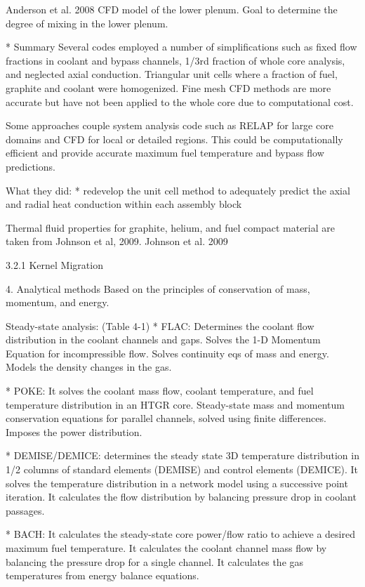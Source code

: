 Anderson et al. 2008 %
CFD model of the lower plenum.
Goal to determine the degree of mixing in the lower plenum.

* Summary
Several codes employed a number of simplifications such as fixed flow fractions in coolant and bypass channels, 1/3rd fraction of whole core analysis, and neglected axial conduction.
Triangular unit cells where a fraction of fuel, graphite and coolant were homogenized.
Fine mesh CFD methods are more accurate but have not been applied to the whole core due to computational cost.

Some approaches couple system analysis code such as RELAP for large core domains and CFD for local or detailed regions.
This could be computationally efficient and provide accurate maximum fuel temperature and bypass flow predictions.

What they did:
* redevelop the unit cell method to adequately predict the axial and radial heat conduction within each assembly block

Thermal fluid properties for graphite, helium, and fuel compact material are taken from Johnson et al, 2009.
Johnson et al. 2009 %

3.2.1 Kernel Migration

4. Analytical methods
Based on the principles of conservation of mass, momentum, and energy.

Steady-state analysis: (Table 4-1)
* FLAC:
Determines the coolant flow distribution in the coolant channels and gaps.
Solves the 1-D Momentum Equation for incompressible flow.
Solves continuity eqs of mass and energy. 
Models the density changes in the gas.

* POKE:
It solves the coolant mass flow, coolant temperature, and fuel temperature distribution in an HTGR core.
Steady-state mass and momentum conservation equations for parallel channels, solved using finite differences.
Imposes the power distribution.

* DEMISE/DEMICE: determines the steady state 3D temperature distribution in 1/2 columns of standard elements (DEMISE) and control elements (DEMICE).
It solves the temperature distribution in a network model using a successive point iteration.
It calculates the flow distribution by balancing pressure drop in coolant passages.

* BACH:
It calculates the steady-state core power/flow ratio to achieve a desired maximum fuel temperature.
It calculates the coolant channel mass flow by balancing the pressure drop for a single channel.
It calculates the gas temperatures from energy balance equations.


